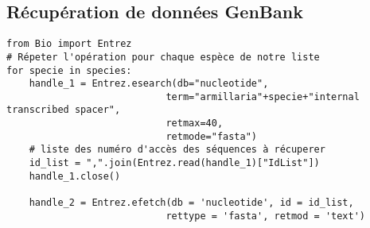 \subsection{Récupération de données GenBank}
\label{ann:annexeD6}
    \begin{tcolorbox}
        \begin{verbatim}
from Bio import Entrez
# Répeter l'opération pour chaque espèce de notre liste
for specie in species:
    handle_1 = Entrez.esearch(db="nucleotide",
                            term="armillaria"+specie+"internal transcribed spacer",
                            retmax=40,
                            retmode="fasta")
    # liste des numéro d'accès des séquences à récuperer
    id_list = ",".join(Entrez.read(handle_1)["IdList"])
    handle_1.close()
    
    handle_2 = Entrez.efetch(db = 'nucleotide', id = id_list,
                            rettype = 'fasta', retmod = 'text')
        \end{verbatim}
    \end{tcolorbox}
